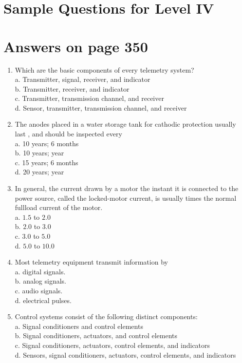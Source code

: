 \documentclass[10pt]{article}
\begin{document}
\section{Sample Questions for Level IV}
\section{Answers on page 350}
\begin{enumerate}
  \item Which are the basic components of every telemetry system?\\
a. Transmitter, signal, receiver, and indicator\\
b. Transmitter, receiver, and indicator\\
c. Transmitter, transmission channel, and receiver\\
d. Sensor, transmitter, transmission channel, and receiver

  \item The anodes placed in a water storage tank for cathodic protection usually last , and should be inspected every\\
a. 10 years; 6 months\\
b. 10 years; year\\
c. 15 years; 6 months\\
d. 20 years; year

  \item In general, the current drawn by a motor the instant it is connected to the power source, called the locked-motor current, is usually times the normal fullload current of the motor.\\
a. $1.5$ to $2.0$\\
b. $2.0$ to $3.0$\\
c. $3.0$ to $5.0$\\
d. $5.0$ to $10.0$

  \item Most telemetry equipment transmit information by\\
a. digital signals.\\
b. analog signals.\\
c. audio signals.\\
d. electrical pulses.

  \item Control systems consist of the following distinct components:\\
a. Signal conditioners and control elements\\
b. Signal conditioners, actuators, and control elements\\
c. Signal conditioners, actuators, control elements, and indicators\\
d. Sensors, signal conditioners, actuators, control elements, and indicators

\end{enumerate}
\end{document}
